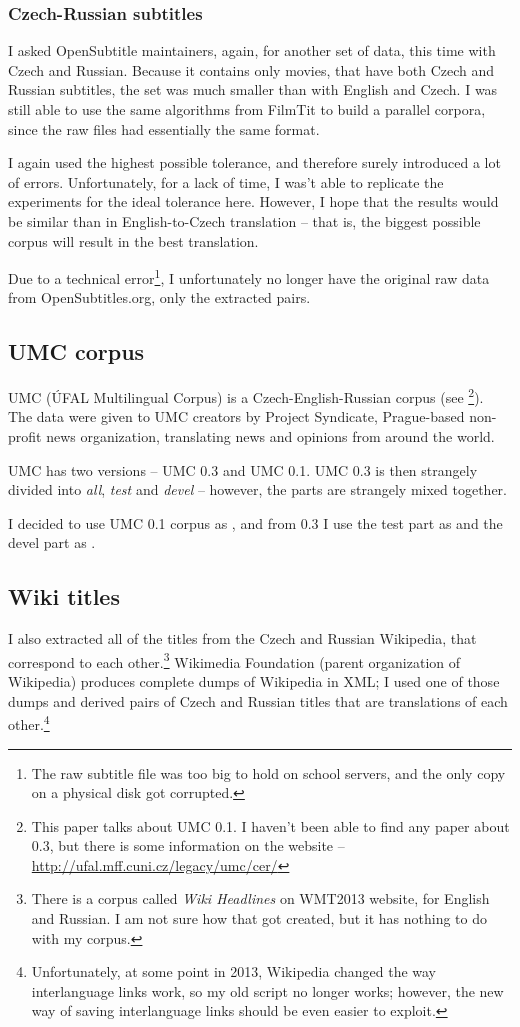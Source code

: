 \subsubsection{Czech-Russian subtitles}

I asked OpenSubtitle maintainers, again, for another set of data, this time with Czech and Russian.
Because it contains only movies, that have both Czech and Russian subtitles, the set was much smaller than with English and Czech. I was still able to use the same algorithms from FilmTit to build a parallel corpora, since the raw files had essentially the same format.

I again used the highest possible tolerance, and therefore surely introduced a lot of errors. Unfortunately, for a lack of time, I was't able to replicate the experiments for the ideal tolerance here. However, I hope that the results would be similar than in English-to-Czech translation -- that is, the biggest possible corpus will result in the best translation.

Due to a technical error\footnote{The raw subtitle file was too big to hold on school servers, and the only copy on a physical disk got corrupted.}, I unfortunately no longer have the original raw data from OpenSubtitles.org, only the extracted pairs. 


\subsection{UMC corpus}
\label{corpora:umc}
UMC (ÚFAL Multilingual Corpus) is a Czech-English-Russian corpus (see \cite{umc}\footnote{This paper talks about UMC 0.1. I haven't been able to find any paper about 0.3, but there is some information on the website -- \url{http://ufal.mff.cuni.cz/legacy/umc/cer/}}). The data were given to UMC creators by Project Syndicate, Prague-based non-profit news organization, translating news and opinions from around the world.

UMC has two versions -- UMC 0.3 and UMC 0.1. UMC 0.3 is then strangely divided into \emph{all}, \emph{test} and \emph{devel} -- however, the parts are strangely mixed together.

I decided to use UMC 0.1 corpus as , and from 0.3 I use the test part as  and the devel part as .


\subsection{Wiki titles}
I also extracted all of the titles from the Czech and Russian Wikipedia, that correspond to each other.\footnote{There is a corpus called \emph{Wiki Headlines} on WMT2013 website, for English and Russian. I am not sure how that got created, but it has nothing to do with my corpus.} 
Wikimedia Foundation (parent organization of Wikipedia) produces complete dumps of Wikipedia in XML; I used one of those dumps and derived pairs of Czech and Russian titles that are translations of each other.\footnote{Unfortunately, at some point in 2013, Wikipedia changed the way interlanguage links work, so my old script no longer works; however, the new way of saving interlanguage links should be even easier to exploit.}

